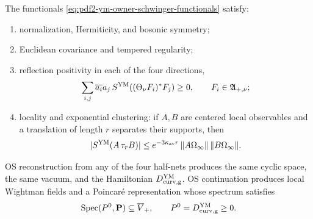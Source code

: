 \begin{proposition}
\label{prop:pdf2-ym-owner-continuum-os-package}
The functionals \eqref{eq:pdf2-ym-owner-schwinger-functionals} satisfy:
\begin{enumerate}
 \item normalization, Hermiticity, and bosonic symmetry;
 \item Euclidean covariance and tempered regularity;
 \item reflection positivity in each of the four directions,
 \begin{equation}\label{eq:pdf2-ym-owner-continuum-reflection-positive}
  \sum_{i,j}\overline{a_i}a_j\,
  S^{\rm YM}\!\left((\Theta_\nu F_i)^*F_j\right)\ge0,
  \qquad F_i\in\mathfrak A_{+,\nu};
 \end{equation}
 \item locality and exponential clustering: if $A,B$ are centered local observables and a
 translation of length $r$ separates their supports, then
 \begin{equation}\label{eq:pdf2-ym-owner-continuum-cluster}
  |S^{\rm YM}(A\,\tau_rB)|
  \le e^{-3\kappa_{\rm av}r}\,
       \|A\Omega_\infty\|\,\|B\Omega_\infty\|.
 \end{equation}
\end{enumerate}
OS reconstruction from any of the four half-nets produces the same
cyclic space, the same vacuum, and the Hamiltonian
$D_{\rm curv,g}^{\rm YM}$. OS continuation produces local Wightman fields and a
Poincaré representation whose spectrum satisfies
\begin{equation}\label{eq:pdf2-ym-owner-wightman-spectrum}
 \operatorname{Spec}(P^0,\mathbf P)\subseteq\overline V_+,
 \qquad P^0=D_{\rm curv,g}^{\rm YM}\ge0.
\end{equation}
\end{proposition}

